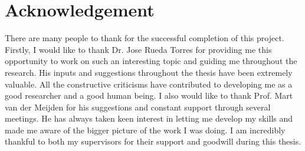 \chapter*{Acknowledgement}

There are many people to thank for the successful completion of this project. Firstly, I would like to thank Dr. Jose Rueda Torres for providing me this opportunity to work on such an interesting topic and guiding me throughout the research. His inputs and suggestions throughout the thesis have been extremely valuable. All the constructive criticisms have contributed to developing me as a good researcher and a good human being. I also would like to thank Prof. Mart van der Meijden for his suggestions and constant support through several meetings. He has always taken keen interest in letting me develop my skills and made me aware of the bigger picture of the work I was doing. I am incredibly thankful to both my supervisors for their support and goodwill during this thesis. 


